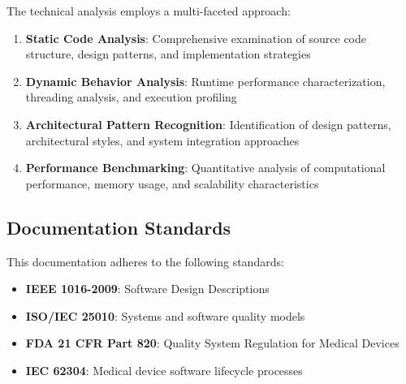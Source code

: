 The technical analysis employs a multi-faceted approach:

\begin{enumerate}
    \item \textbf{Static Code Analysis}: Comprehensive examination of source code structure, design patterns, and implementation strategies
    
    \item \textbf{Dynamic Behavior Analysis}: Runtime performance characterization, threading analysis, and execution profiling
    
    \item \textbf{Architectural Pattern Recognition}: Identification of design patterns, architectural styles, and system integration approaches
    
    \item \textbf{Performance Benchmarking}: Quantitative analysis of computational performance, memory usage, and scalability characteristics
\end{enumerate}

\subsection{Documentation Standards}

This documentation adheres to the following standards:

\begin{itemize}
    \item \textbf{IEEE 1016-2009}: Software Design Descriptions
    \item \textbf{ISO/IEC 25010}: Systems and software quality models
    \item \textbf{FDA 21 CFR Part 820}: Quality System Regulation for Medical Devices
    \item \textbf{IEC 62304}: Medical device software lifecycle processes
\end{itemize}
